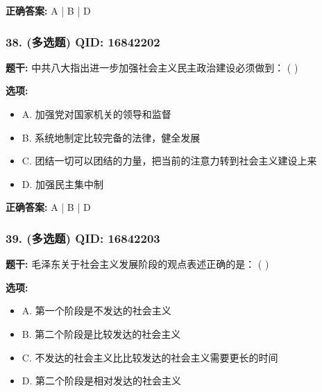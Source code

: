 \documentclass[12pt,UTF8]{ctexart}
\begin{document}
\textbf{正确答案:}
A | B | D

\vspace{0.3em}\hrulefill\vspace{0.7em}

\subsubsection*{38. (多选题) \small QID: 16842202}

\textbf{题干:}
中共八大指出进一步加强社会主义民主政治建设必须做到： ( )

\textbf{选项:}
\begin{itemize}[leftmargin=*]

  \item A. 加强党对国家机关的领导和监督

  \item B. 系统地制定比较完备的法律，健全发展

  \item C. 团结一切可以团结的力量，把当前的注意力转到社会主义建设上来

  \item D. 加强民主集中制

\end{itemize}

\textbf{正确答案:}
A | B | D

\vspace{0.3em}\hrulefill\vspace{0.7em}

\subsubsection*{39. (多选题) \small QID: 16842203}

\textbf{题干:}
毛泽东关于社会主义发展阶段的观点表述正确的是： ( )

\textbf{选项:}
\begin{itemize}[leftmargin=*]

  \item A. 第一个阶段是不发达的社会主义

  \item B. 第二个阶段是比较发达的社会主义

  \item C. 不发达的社会主义比比较发达的社会主义需要更长的时间

  \item D. 第二个阶段是相对发达的社会主义

\end{itemize}
\end{document}
